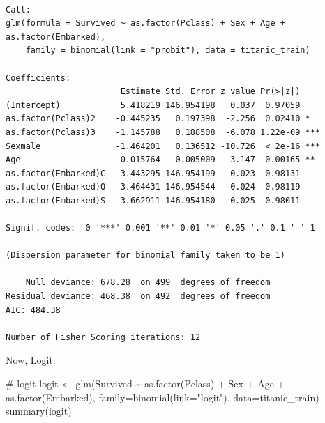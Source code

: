 \documentclass[
  letterpaper,
  DIV=11,
  numbers=noendperiod]{scrreprt}
\newenvironment{Shaded}{\begin{snugshade}}{\end{snugshade}}
\newcommand{\AttributeTok}[1]{\textcolor[rgb]{0.40,0.45,0.13}{#1}}
\newcommand{\CommentTok}[1]{\textcolor[rgb]{0.37,0.37,0.37}{#1}}
\newcommand{\FunctionTok}[1]{\textcolor[rgb]{0.28,0.35,0.67}{#1}}
\newcommand{\NormalTok}[1]{\textcolor[rgb]{0.00,0.23,0.31}{#1}}
\newcommand{\OtherTok}[1]{\textcolor[rgb]{0.00,0.23,0.31}{#1}}
\newcommand{\SpecialCharTok}[1]{\textcolor[rgb]{0.37,0.37,0.37}{#1}}
\newcommand{\StringTok}[1]{\textcolor[rgb]{0.13,0.47,0.30}{#1}}
\begin{document}
\begin{verbatim}

Call:
glm(formula = Survived ~ as.factor(Pclass) + Sex + Age + as.factor(Embarked), 
    family = binomial(link = "probit"), data = titanic_train)

Coefficients:
                       Estimate Std. Error z value Pr(>|z|)    
(Intercept)            5.418219 146.954198   0.037  0.97059    
as.factor(Pclass)2    -0.445235   0.197398  -2.256  0.02410 *  
as.factor(Pclass)3    -1.145788   0.188508  -6.078 1.22e-09 ***
Sexmale               -1.464201   0.136512 -10.726  < 2e-16 ***
Age                   -0.015764   0.005009  -3.147  0.00165 ** 
as.factor(Embarked)C  -3.443295 146.954199  -0.023  0.98131    
as.factor(Embarked)Q  -3.464431 146.954544  -0.024  0.98119    
as.factor(Embarked)S  -3.662911 146.954180  -0.025  0.98011    
---
Signif. codes:  0 '***' 0.001 '**' 0.01 '*' 0.05 '.' 0.1 ' ' 1

(Dispersion parameter for binomial family taken to be 1)

    Null deviance: 678.28  on 499  degrees of freedom
Residual deviance: 468.38  on 492  degrees of freedom
AIC: 484.38

Number of Fisher Scoring iterations: 12
\end{verbatim}

Now, Logit:

\begin{Shaded}
\begin{Highlighting}[]
\CommentTok{\# logit}
\NormalTok{logit }\OtherTok{\textless{}{-}} \FunctionTok{glm}\NormalTok{(Survived }\SpecialCharTok{\textasciitilde{}} \FunctionTok{as.factor}\NormalTok{(Pclass) }\SpecialCharTok{+}\NormalTok{ Sex }\SpecialCharTok{+}\NormalTok{ Age }\SpecialCharTok{+} \FunctionTok{as.factor}\NormalTok{(Embarked), }
              \AttributeTok{family=}\FunctionTok{binomial}\NormalTok{(}\AttributeTok{link=}\StringTok{"logit"}\NormalTok{), }
              \AttributeTok{data=}\NormalTok{titanic\_train)}
\FunctionTok{summary}\NormalTok{(logit)}
\end{Highlighting}
\end{Shaded}
\end{document}
